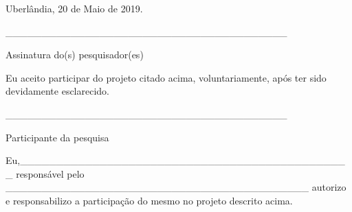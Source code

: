 \begin{center}
Uberlândia, 20 de Maio de 2019.
\end{center}

\vspace{\baselineskip}

\vspace{\baselineskip}

\vspace{\baselineskip}

\vspace{\baselineskip}

\begin{center}
\_\_\_\_\_\_\_\_\_\_\_\_\_\_\_\_\_\_\_\_\_\_\_\_\_\_\_\_\_\_\_\_\_\_\_\_\_\_\_\par

Assinatura do(s) pesquisador(es)\par
\end{center}


\vspace{\baselineskip}

\vspace{\baselineskip}
Eu aceito participar do projeto citado acima, voluntariamente, após ter sido devidamente esclarecido.

\begin{center}
\vspace{\baselineskip}
\_\_\_\_\_\_\_\_\_\_\_\_\_\_\_\_\_\_\_\_\_\_\_\_\_\_\_\_\_\_\_\_\_\_\_\_\_\_\_\par

Participante da pesquisa\par
\end{center}


\vspace{\baselineskip}
Eu,\_\_\_\_\_\_\_\_\_\_\_\_\_\_\_\_\_\_\_\_\_\_\_\_\_\_\_\_\_\_\_\_\_\_\_\_\_\_\_\_\_\_\_\_\_\_
responsável pelo \_\_\_\_\_\_\_\_\_\_\_\_\_\_\_\_\_\_\_\_\_\_\_\_\_\_\_\_\_\_\_\_\_\_\_\_\_\_\_\_\_\_ autorizo e responsabilizo a participação do mesmo no projeto descrito acima.\par


\vspace{\baselineskip}


